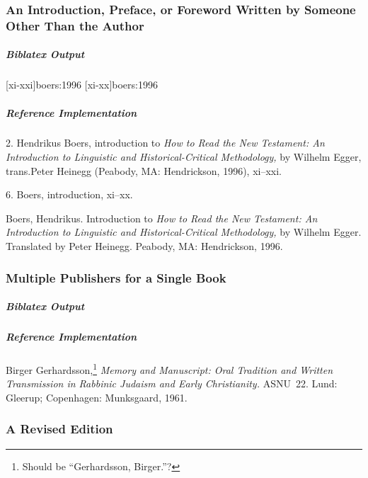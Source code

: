 \documentclass[a4paper]{article}
\newenvironment{biboutput}{%
  \subparagraph{Biblatex Output}
}{\color{black}}
\newenvironment{refimp}{%
  \subparagraph{Reference Implementation}
  \color{reference-colour}
  \rm
}{\par\color{black}}
\begin{document}
\subsubsection{An Introduction, Preface, or Foreword Written by Someone Other
Than the Author}

\begin{biboutput}
  [xi-xxi]{boers:1996}
  [xi-xx]{boers:1996}
\end{biboutput}

\begin{refimp}
  \hspace*{\bibindent}2. Hendrikus Boers, introduction to \emph{How to Read
  the New Testament: An Introduction to Linguistic and Historical-Critical
  Methodology,} by Wilhelm Egger, trans.\@ Peter Heinegg (Peabody, MA:
  Hendrickson, 1996), xi–xxi.

  \hspace*{\bibindent}6. Boers, introduction, xi–xx.

  \hangindent\bibindent Boers, Hendrikus. Introduction to \emph{How to Read
  the New Testament: An Introduction to Linguistic and Historical-Critical
  Methodology,} by Wilhelm Egger. Translated by Peter Heinegg. Peabody, MA:
  Hendrickson, 1996.
\end{refimp}

\subsubsection{Multiple Publishers for a Single Book}

\begin{biboutput}
\end{biboutput}

\begin{refimp}
  \hangindent\bibindent Birger Gerhardsson,\footnote{Should be “Gerhardsson,
  Birger.”?} \emph{Memory and Manuscript: Oral Tradition and Written
  Transmission in Rabbinic Judaism and Early Christianity.} ASNU~22. Lund:
  Gleerup; Copenhagen: Munksgaard, 1961.

\end{refimp}

\subsubsection{A Revised Edition}
\end{document}
